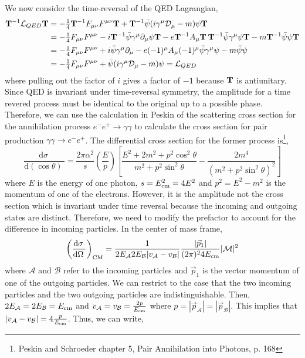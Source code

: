 \documentclass[12pt]{article}
\renewcommand{\d}[1]{ \mathrm{d}#1 \:}
\newcommand{\deriv}[2]{\frac{\d{#1}}{\d{#2}}}
\newcommand{\lagrange}{\mathcal{L}}
\begin{document}
We now consider the time-reversal of the QED Lagrangian,  
\begin{align*}
\T^{-1} \lagrange_{QED} \T & = - \tfrac{1}{4} \T^{-1} F_{\mu \nu} F^{\mu \nu} \T + \T^{-1} \bar{\psi} (i \gamma^\mu \mathcal{D}_\mu - m) \psi \T
\\
& = - \tfrac{1}{4} F_{\mu \nu} F^{\mu \nu} - i \T^{-1} \bar{\psi} \gamma^\mu \partial_\mu \psi \T - e \T^{-1} A_\mu \T \: \T^{-1} \bar{\psi} \gamma^\mu \psi \T - m \T^{-1} \bar{\psi} \psi \T
\\
& =  - \tfrac{1}{4} F_{\mu \nu} F^{\mu \nu} + i \bar{\psi} \gamma^\mu \partial_\mu - e (-1)^\mu A_\mu (-1)^\mu \bar{\psi} \gamma^\mu \psi - m \bar{\psi} \psi
\\
& = -  \tfrac{1}{4} F_{\mu \nu} F^{\mu \nu} + \bar{\psi} (i \gamma^\mu \mathcal{D}_\mu - m ) \psi = \lagrange_{QED}
\end{align*}
where pulling out the factor of $i$ gives a factor of $-1$ because $\mathbf{T}$ is antiunitary. Since QED is invariant under time-reversal symmetry, the amplitude for a time revered process must be identical to the original up to a possible phase. Therefore, we can use the calculation in Peskin of the scattering cross section for the annihilation process $e^{-} e^{+} \to \gamma \gamma$ to calculate the cross section for pair production $\gamma \gamma \to e^{-} e^{+}$. The differential cross section for the former process is\footnote{Peskin and Schroeder chapter 5, Pair Annihilation into Photons, p. 168},
\[ \deriv{\sigma}{(\cos{\theta})} = \frac{2 \pi \alpha^2}{s} \left( \frac{E}{p} \right) \left[ \frac{E^2 + 2m^2 + p^2 \cos^2{\theta}}{m^2 + p^2 \sin^2{\theta}} - \frac{2m^4}{(m^2 + p^2 \sin^2{\theta})^2} \right] \]
where $E$ is the energy of one photon, $s = E_{\mathrm{cm}}^2 = 4E^2$ and $p^2 = E^2 - m^2$ is the momentum of one of the electrons. However, it is the amplitude not the cross section which is invariant under time reversal because the incoming and outgoing states are distinct. Therefore, we need to modify the prefactor to account for the difference in incoming particles. In the center of mass frame,
\[ \left( \deriv{\sigma}{\Omega} \right)_{\mathrm{CM}} = \frac{1}{2 E_{\mathcal{A}} 2 E_{\mathcal{B}} |v_{\mathcal{A}} - v_{\mathcal{B}} | } \frac{|\vec{p}_1|}{(2 \pi)^2 4 \Ecm} | \mathcal{M} |^2 \]
where $\mathcal{A}$ and $\mathcal{B}$ refer to the incoming particles and $\vec{p}_1$ is the vector momentum of one of the outgoing particles. We can restrict to the case that the two incoming particles and the two outgoing particles are indistinguishable. Then, $2E_{\mathcal{A}} = 2 E_{\mathcal{B}} = E_{\mathrm{cm}}$ and $v_{\mathcal{A}} = v_{\mathcal{B}} = \frac{2p}{E_{\mathrm{cm}}}$ where $p = |\vec{p}_{\mathcal{A}}| = |\vec{p}_{\mathcal{B}}|$. This implies that $|v_{\mathcal{A}} - v_{\mathcal{B}}| = 4 \frac{p}{E_{\mathrm{cm}}}$.  Thus, we can write,
\end{document}
